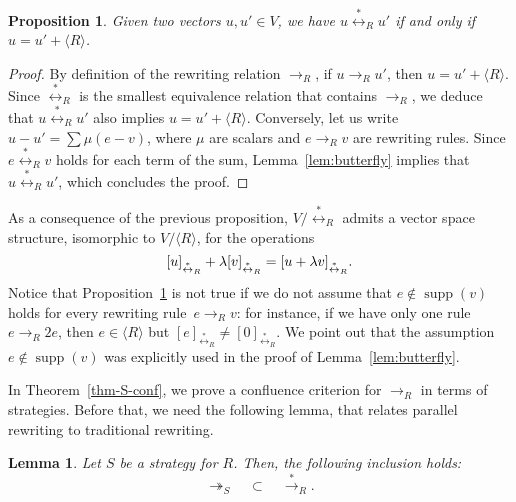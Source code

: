 \documentclass[11pt]{article}
\newtheorem{lemma}[theorem]{Lemma}
\newtheorem{proposition}[theorem]{Proposition}
\theoremstyle{definition}
\DeclareMathOperator{\supp}{supp}
\newcommand\Span[1]{\langle #1\rangle}
\newcommand\rewR{\to_R}
\newcommand\parS{\twoheadrightarrow_S}
\newcommand\transR{\overset{*}{\to}_R}
\newcommand\equivR{\overset{*}{\leftrightarrow}_R}
\begin{document}
\begin{proposition}\label{prop:vs_structure}
  Given two vectors $u,u'\in V$, we have $u\equivR u'$ if and only if
  $u=u'+\Span{R}$.
\end{proposition}

\begin{proof}
  By definition of the rewriting relation $\rewR$, if $u\rewR u'$, then
  $u=u'+\Span{R}$. Since $\equivR$ is the smallest equivalence relation
  that contains $\rewR$, we deduce that $u\equivR u'$ also implies
  $u=u'+\Span{R}$. Conversely, let us write $u-u'=\sum\mu(e-v)$, where
  $\mu$ are scalars and $e\rewR v$ are rewriting rules. Since
  $e\equivR v$ holds for each term of the sum, Lemma~\ref{lem:butterfly}
  implies that $u\equivR u'$, which concludes the proof.
\end{proof}
\smallskip

As a consequence of the previous proposition, $V/\equivR$ admits a vector
space structure, isomorphic to $V/\Span{R}$, for the operations
\[[u]_{\equivR}+\lambda[v]_{\equivR}=[u+\lambda v]_{\equivR}.\smallskip\]
\noindent
Notice that Proposition~\ref{prop:vs_structure} is not true if we do not
assume that $e\notin\supp(v)$ holds for every rewriting rule~$e\rewR v$: 
for instance, if we have only one rule $e\rewR 2e$, then $e\in\Span{R}$ 
but $[e]_{\equivR}\neq[0]_{\equivR}$. We point out that the assumption
$e\notin\supp(v)$ was explicitly used in the proof of
Lemma~\ref{lem:butterfly}.
\medskip

In Theorem~\ref{thm-S-conf}, we prove a confluence criterion for $\rewR$
in terms of strategies. Before that, we need the following lemma, that
relates parallel rewriting to traditional rewriting.
\smallskip

\begin{lemma}\label{lem:strategies}
  Let $S$ be a strategy for $R$. Then, the following inclusion holds:
  \[\parS\quad\subset\quad\transR.\]
\end{lemma}
\end{document}
